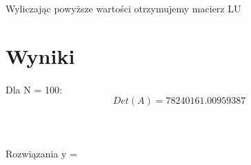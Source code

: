 \documentclass{article}
\begin{document}
Wyliczając powyższe wartości otrzymujemy macierz LU\\

\bigskip
\section{Wyniki}


\paragraph{}
Dla N = 100: \\
\begin{equation*}
Det(A) = 78240161.00959387 
\end{equation*}
\\\\\\
Rozwiązania y = \\
\end{document}
